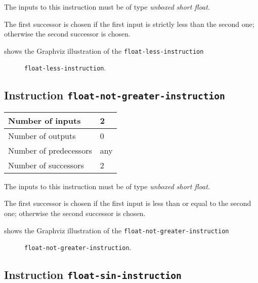 The inputs to this instruction must be of type \emph{unboxed short
  float}.

The first successor is chosen if the first input is strictly less than
the second one; otherwise the second successor is chosen. 

 shows the Graphviz illustration of the
\texttt{float-less-instruction}

\begin{figure}
\begin{center}
\end{center}
\caption{\label{fig-float-less-instruction}
\texttt{float-less-instruction}.}
\end{figure}

\subsection{Instruction \texttt{float-not-greater-instruction}}
\label{mir-instruction-float-not-greater}

\begin{tabular}{|l|l|}
\hline
Number of inputs & 2\\
\hline
Number of outputs & 0\\
\hline
Number of predecessors & any\\
\hline
Number of successors & 2\\
\hline
\end{tabular}

The inputs to this instruction must be of type \emph{unboxed short
  float}.

The first successor is chosen if the first input is less than or equal
to the second one; otherwise the second successor is chosen.

 shows the Graphviz illustration of the
\texttt{float-not-greater-instruction}

\begin{figure}
\begin{center}
\end{center}
\caption{\label{fig-float-not-greater-instruction}
\texttt{float-not-greater-instruction}.}
\end{figure}

\subsection{Instruction \texttt{float-sin-instruction}}
\label{mir-instruction-float-div}

